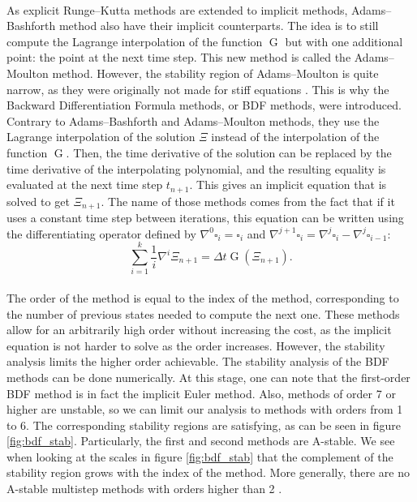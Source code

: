         \paragraph{}
        As explicit Runge--Kutta methods are extended to implicit methods, Adams--Bashforth method also have their implicit counterparts.
        The idea is to still compute the Lagrange interpolation of the function $\operatorname{G}$ but with one additional point: the point at the next time step.
        This new method is called the Adams--Moulton method.
        However, the stability region of Adams--Moulton is quite narrow, as they were originally not made for stiff equations \cite{Iserles2008}.
        This is why the Backward Differentiation Formula methods, or BDF methods, were introduced.
        Contrary to Adams--Bashforth and Adams--Moulton methods, they use the Lagrange interpolation of the solution $\Xi$ instead of the interpolation of the function $\operatorname{G}$.
        Then, the time derivative of the solution can be replaced by the time derivative of the interpolating polynomial, and the resulting equality is evaluated at the next time step $t_{n+1}$.
        This gives an implicit equation that is solved to get $\Xi_{n+1}$.
        The name of those methods comes from the fact that if it uses a constant time step between iterations, this equation can be written using the differentiating operator defined by $\nabla^0 \square_i = \square_i$ and $\nabla^{j+1} \square_i = \nabla^j \square_i - \nabla^j \square_{i-1}$:
        \begin{equation}
          \sum_{i=1}^k \frac{1}{i} \nabla^i \Xi_{n+1} = \Delta t \operatorname{G}\left(\Xi_{n+1}\right) .
        \end{equation}

        \paragraph{}
        The order of the method is equal to the index of the method, corresponding to the number of previous states needed to compute the next one.
        These methods allow for an arbitrarily high order without increasing the cost, as the implicit equation is not harder to solve as the order increases.
        However, the stability analysis limits the higher order achievable.
        The stability analysis of the BDF methods can be done numerically.
        At this stage, one can note that the first-order BDF method is in fact the implicit Euler method.
        Also, methods of order 7 or higher are unstable, so we can limit our analysis to methods with orders from 1 to 6.
        The corresponding stability regions are satisfying, as can be seen in figure \ref{fig:bdf_stab}.
        Particularly, the first and second methods are A-stable.
        We see when looking at the scales in figure \ref{fig:bdf_stab} that the complement of the stability region grows with the index of the method.
        More generally, there are no A-stable multistep methods with orders higher than 2 \cite{Dahlquist1963, HairerWanner1996}.

